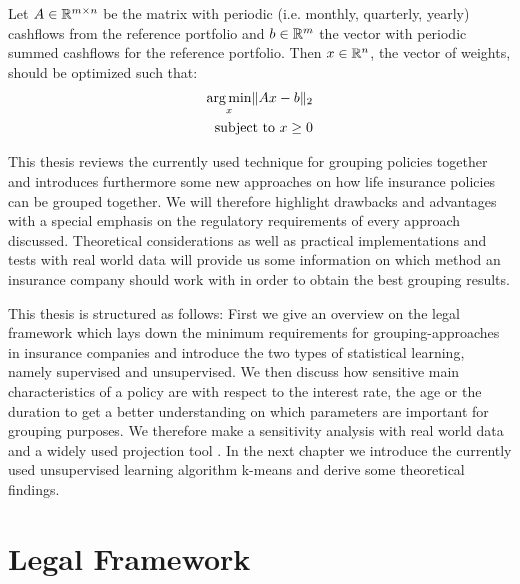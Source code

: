 \begin{definition}
	Let $A \in \mathbb{R}^{m \times n}$ be the matrix with periodic (i.e. monthly, quarterly, yearly) cashflows from the reference portfolio and $b \in \mathbb{R}^m$ the vector with periodic summed cashflows for the reference portfolio. Then $x \in \mathbb{R}^n$, the vector of weights, should be optimized such that:  
	\begin{align*}
		\operatorname*{arg\,min}_x \lVert Ax -b \rVert_2 \\
		\text{subject to } x \geq 0
	\end{align*}
\end{definition}







This thesis reviews the currently used technique for grouping policies together and introduces furthermore some new approaches on how life insurance policies can be grouped together. We will therefore highlight drawbacks and advantages with a special emphasis on the regulatory requirements of every approach discussed. Theoretical considerations as well as practical implementations and tests with real world data will provide us some information on which method an insurance company should work with in order to obtain the best grouping results.  

This thesis is structured as follows: First we give an overview on the legal framework which lays down the minimum requirements for grouping-approaches in insurance companies and introduce the two types of statistical learning, namely supervised and unsupervised. We then discuss how sensitive main characteristics of a policy are with respect to the interest rate, the age or the duration to get a better understanding on which parameters are important for grouping purposes. We therefore make a sensitivity analysis with real world data and a widely used projection tool . In the next chapter we introduce the currently used unsupervised learning algorithm k-means and derive some theoretical findings. 


\section{Legal Framework}

